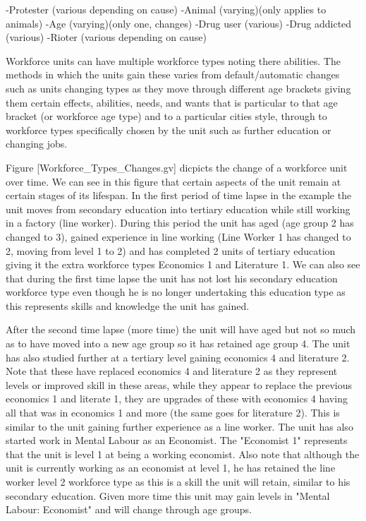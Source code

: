 -Protester (various depending on cause)
-Animal (varying)(only applies to animals)
-Age (varying)(only one, changes)
-Drug user (various)
-Drug addicted (various)
-Rioter (various depending on cause)




Workforce units can have multiple workforce types noting there abilities. The methods in which the units gain these varies from default/automatic changes such as units changing types as they move through different age brackets giving them certain effects, abilities, needs, and wants that is particular to that age bracket (or workforce age type) and to a particular cities style, through to workforce types specifically chosen by the unit such as further education or changing jobs. 

Figure [Workforce_Types_Changes.gv] dicpicts the change of a workforce unit over time. We can see in this figure that certain aspects of the unit remain at certain stages of its lifespan. In the first period of time lapse in the example the unit moves from secondary education into tertiary education while still working in a factory (line worker). During this period the unit has aged (age group 2 has changed to 3), gained experience in line working (Line Worker 1 has changed to 2, moving from level 1 to 2) and has completed 2 units of tertiary education giving it the extra workforce types Economics 1 and Literature 1. We can also see that during the first time lapse the unit has not lost his secondary education workforce type even though he is no longer undertaking this education type as this represents skills and knowledge the unit has gained. 

After the second time lapse (more time) the unit will have aged but not so much as to have moved into a new age group so it has retained age group 4. The unit has also studied further at a tertiary level gaining economics 4 and literature 2. Note that these have replaced economics 4 and literature 2 as they represent levels or improved skill in these areas, while they appear to replace the previous economics 1 and literate 1, they are upgrades of these with economics 4 having all that was in economics 1 and more (the same goes for literature 2). This is similar to the unit gaining further experience as a line worker. The unit has also started work in Mental Labour as an Economist. The "Economist 1" represents that the unit is level 1 at being a working economist. Also note that although the unit is currently working as an economist at level 1, he has retained the line worker level 2 workforce type as this is a skill the unit will retain, similar to his secondary education. Given more time this unit may gain levels in "Mental Labour: Economist" and will change through age groups. 

